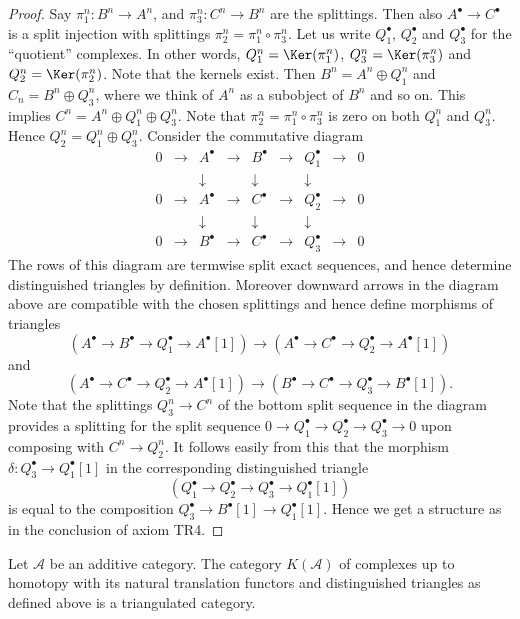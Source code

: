 \begin{proof}
Say $\pi_1^n : B^n \to A^n$, and $\pi_3^n : C^n \to B^n$ are the splittings.
Then also $A^\bullet \to C^\bullet$ is a split injection with splittings
$\pi_2^n = \pi_1^n \circ \pi_3^n$. Let us write $Q_1^\bullet$, $Q_2^\bullet$
and $Q_3^\bullet$ for the ``quotient'' complexes. In other words,
$Q_1^n = \Ker(\pi_1^n)$, $Q_3^n = \Ker(\pi_3^n)$ and
$Q_2^n = \Ker(\pi_2^n)$. Note that the kernels exist. Then
$B^n = A^n \oplus Q_1^n$ and $C_n = B^n \oplus Q_3^n$, where we think of $A^n$
as a subobject of $B^n$ and so on. This implies
$C^n = A^n \oplus Q_1^n \oplus Q_3^n$. Note that
$\pi_2^n = \pi_1^n \circ \pi_3^n$ is zero on both $Q_1^n$ and $Q_3^n$. Hence
$Q_2^n = Q_1^n \oplus Q_3^n$. Consider the commutative diagram
$$
\begin{matrix}
0 & \to & A^\bullet & \to & B^\bullet & \to & Q_1^\bullet & \to & 0 \\
  &     & \downarrow &     & \downarrow &     & \downarrow  & \\
0 & \to & A^\bullet & \to & C^\bullet & \to & Q_2^\bullet & \to & 0 \\
  &     & \downarrow &     & \downarrow &     & \downarrow  & \\
0 & \to & B^\bullet & \to & C^\bullet & \to & Q_3^\bullet & \to & 0
\end{matrix}
$$
The rows of this diagram are termwise split exact sequences, and
hence determine distinguished triangles by
definition. Moreover downward arrows in the diagram above
are compatible with the chosen splittings and hence
define morphisms of triangles
$$
(A^\bullet \to B^\bullet \to Q_1^\bullet \to A^\bullet[1])
\longrightarrow
(A^\bullet \to C^\bullet \to Q_2^\bullet \to A^\bullet[1])
$$
and
$$
(A^\bullet \to C^\bullet \to Q_2^\bullet \to A^\bullet[1])
\longrightarrow
(B^\bullet \to C^\bullet \to Q_3^\bullet \to B^\bullet[1]).
$$
Note that the splittings $Q_3^n \to C^n$
of the bottom split sequence in the diagram provides a splitting
for the split sequence
$0 \to Q_1^\bullet \to Q_2^\bullet \to Q_3^\bullet \to 0$
upon composing with $C^n \to Q_2^n$. It follows easily from this
that the morphism $\delta : Q_3^\bullet \to Q_1^\bullet[1]$
in the corresponding distinguished triangle
$$
(Q_1^\bullet \to Q_2^\bullet \to Q_3^\bullet \to Q_1^\bullet[1])
$$
is equal to the composition $Q_3^\bullet \to B^\bullet[1] \to Q_1^\bullet[1]$.
Hence we get a structure as in the conclusion of axiom TR4.
\end{proof}

\begin{proposition}
\label{proposition-homotopy-category-triangulated}
Let $\mathcal{A}$ be an additive category.
The category $K(\mathcal{A})$ of complexes up to
homotopy with its natural translation functors
and distinguished triangles as defined above
is a triangulated category.
\end{proposition}

